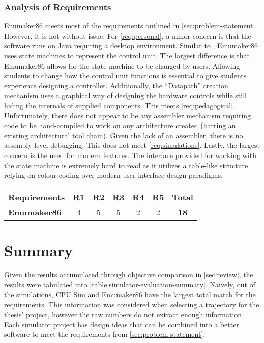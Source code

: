 \subsubsection*{Analysis of Requirements}

Enumaker86 meets most of the requirements outlined in \cref{sec:problem-statement}. However, it is not without issue. For \cref{req:personal}, a minor concern is that the software runs on Java requiring a desktop environment. Similar to \cite{McLoughlin2010,Nakamura2013}, Emumaker86 uses state machines to represent the control unit. The largest difference is that Emumaker86 allows for the state machine to be changed by users. Allowing students to change how the control unit functions is essential to give students experience designing a controller. Additionally, the ``Datapath'' creation mechanism uses a graphical way of designing the hardware controls while still hiding the internals of supplied components. This meets \cref{req:pedagogical}. Unfortunately, there does not appear to be any assembler mechanism requiring code to be hand-compiled to work on any architecture created (barring an existing architectural tool chain). Given the lack of an assembler, there is no assembly-level debugging. This does not meet \cref{req:simulations}. Lastly, the largest concern is the need for modern features. The interface provided for working with the state machine is extremely hard to read as it utilizes a table-like structure relying on colour coding over modern user interface design paradigms.

\begin{table}[h!]
    \centering
    \begin{tabular}{lcccccc}
        \textbf{Requirements} & \textbf{\hyperref[req:personal]{R1}} & \textbf{\hyperref[req:configuration]{R2}} & \textbf{\hyperref[req:pedagogical]{R3}} & \textbf{\hyperref[req:simulations]{R4}} & \textbf{\hyperref[req:modern]{R5}} & \textbf{Total} \\ \hline
        \textbf{Emumaker86 \cite{Black2013}}
        & 4 & 5 & 5 & 2 & 2 & \textbf{18} \\ 
    \end{tabular}
\end{table}

\section{Summary}
\label{sec:review-summary}

Given the results accumulated through objective comparison in \cref{sec:review}, the results were tabulated into \cref{table:simulator-evaluation-summary}. Naively, out of the simulations, CPU Sim \cite{Skrien2001,Skrien2017} and Emumaker86 \cite{Black2013} have the largest total match for the requirements. This information was considered when selecting a trajectory for the thesis' project, however the raw numbers do not extract enough information. Each simulator project has design ideas that can be combined into a better software to meet the requirements from \cref{sec:problem-statement}. 

